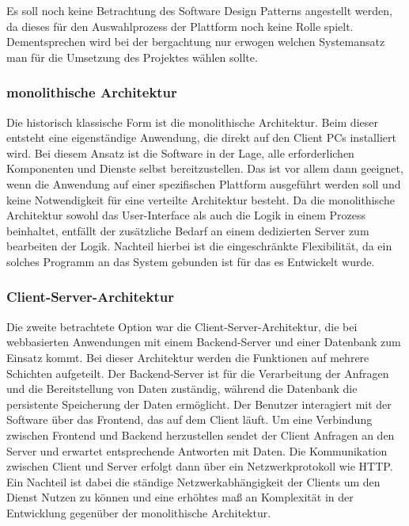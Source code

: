 Es soll noch keine Betrachtung des Software Design Patterns angestellt werden, da dieses für den Auswahlprozess der Plattform noch keine Rolle spielt. Dementsprechen wird bei der bergachtung nur erwogen welchen Systemansatz man für die Umsetzung des Projektes wählen sollte.

\subsubsection{monolithische Architektur}
\label{sec:monolithisch}
Die historisch klassische Form ist die monolithische Architektur. Beim dieser entsteht eine eigenständige Anwendung, die \zB direkt auf den Client PCs installiert wird. Bei diesem Ansatz ist die Software in der Lage, alle erforderlichen Komponenten und Dienste selbst bereitzustellen. Das ist vor allem dann geeignet, wenn die Anwendung auf einer spezifischen Plattform ausgeführt werden soll und keine Notwendigkeit für eine verteilte Architektur besteht. Da die monolithische Architektur sowohl das User-Interface als auch die Logik in einem Prozess beinhaltet, entfällt der zusätzliche Bedarf an einem dedizierten Server zum bearbeiten der Logik. Nachteil hierbei ist die eingeschränkte Flexibilität, da ein solches Programm an das System gebunden ist für das es Entwickelt wurde.

\subsubsection{Client-Server-Architektur}
\label{sec:ClientServer}
Die zweite betrachtete Option war die Client-Server-Architektur, die bei webbasierten Anwendungen mit einem Backend-Server und einer Datenbank zum Einsatz kommt. Bei dieser Architektur werden die Funktionen auf mehrere Schichten aufgeteilt. Der Backend-Server ist für die Verarbeitung der Anfragen und die Bereitstellung von Daten zuständig, während die Datenbank die persistente Speicherung der Daten ermöglicht. Der Benutzer interagiert mit der Software über das Frontend, das auf dem Client läuft. Um eine Verbindung zwischen Frontend und Backend herzustellen sendet der Client Anfragen an den Server und erwartet entsprechende Antworten mit Daten. Die Kommunikation zwischen Client und Server erfolgt dann über ein Netzwerkprotokoll wie HTTP. Ein Nachteil ist dabei die ständige Netzwerkabhängigkeit der Clients um den Dienst Nutzen zu können und eine erhöhtes maß an Komplexität in der Entwicklung gegenüber der monolithische Architektur.

